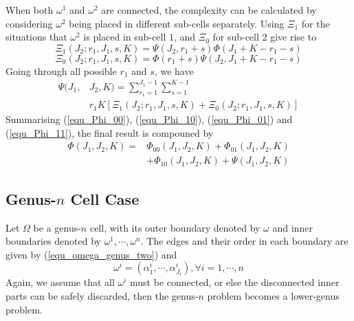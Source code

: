 \documentclass[Afour,sageh,times]{sagej}
\begin{document}
When both $\omega^1$ and $\omega^2$ are connected, the complexity can be calculated by considering $\omega^2$ being placed in 
different sub-cells separately. Using $\Xi_1$ for the situations that $\omega^2$ is placed in sub-cell $1$, 
and $\Xi_0$ for sub-cell $2$ give rise to
\begin{equation}
\Xi_{1}(J_2; r_1, J_1, s, K) = \Psi(J_2, r_1+s)\Phi(J_1+K-r_1-s)
\end{equation}
\begin{equation}
\Xi_{0}(J_2; r_1, J_1, s, K) = \Phi(r_1+s)\Psi(J_2, J_1+K-r_1-s)
\end{equation}
Going through all possible $r_1$ and $s$, we have 
\begin{equation}\label{equ_Phi_11}
\begin{aligned}
\Psi(J_1, &J_2, K) = \sum\limits_{r_1 = 1}^{J_1-1}\sum\limits_{s = 1}^{K-1}\\
&r_1K\left[\Xi_1\left(J_2; r_1, J_1, s, K\right) + \Xi_0\left(J_2; r_1, J_1, s, K\right)\right]
\end{aligned}
\end{equation} 
Summarising (\ref{equ_Phi_00}), (\ref{equ_Phi_10}), (\ref{equ_Phi_01}) and (\ref{equ_Phi_11}), the final result is compouned by
\begin{equation}
\begin{aligned}
\Phi(J_1, J_2, K) =& \Phi_{00}(J_1, J_2, K) + \Phi_{01}(J_1, J_2, K)\\
& + \Phi_{10}(J_1, J_2, K) + \Psi(J_1, J_2, K)
\end{aligned}
\end{equation}

\subsection{Genus-$n$ Cell Case}
Let $\Omega$ be a genus-$n$ cell, with its outer boundary denoted by $\omega$ and inner boundaries denoted by $\omega^1, \cdots, \omega^n$. The edges and their order in each boundary are given by (\ref{equ_omega_genus_two}) and 
\begin{equation}\label{equ_inner_boundaries}
\omega^i = (\alpha^i_1, \cdots, \alpha^i_{J_i}), \forall i = 1, \cdots, n
\end{equation}
Again, we assume that all $\omega^i$ must be connected, or else the disconnected inner parts can be safely discarded, then the genus-$n$ problem becomes a lower-genus problem. 
\end{document}
